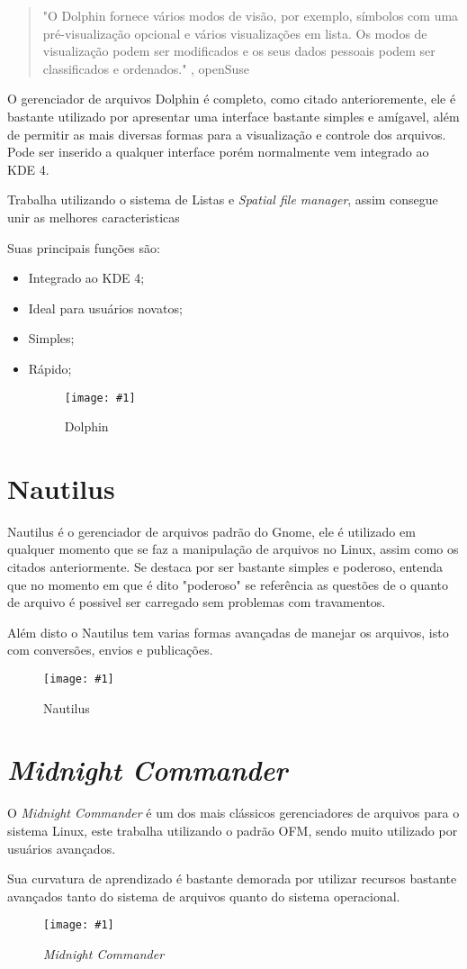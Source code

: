 \documentclass[
	12pt,				%
	openright,			%
	twoside,			%
	a4paper,			%
	chapter=TITLE,		%
	section=TITLE,		%
	english,	
	brazil				%
]{abntex2}
\newcommand{\imagem}[3]{
	\begin{figure}[htb]
		\begin{center}
			\texttt{[image: \#1]}
		\end{center}
		\caption{#2}%
	\end{figure}	
}
\begin{document}
\begin{quote}
"O Dolphin fornece vários modos de visão, por exemplo, símbolos com uma pré-visualização opcional e vários visualizações em lista. Os modos de visualização podem ser modificados e os seus dados pessoais podem ser classificados e ordenados." , openSuse
\end{quote}

O gerenciador de arquivos Dolphin é completo, como citado anterioremente, ele é bastante utilizado por apresentar uma interface bastante simples e amígavel, além de permitir as mais diversas formas para a visualização e controle dos arquivos. Pode ser inserido a qualquer interface porém normalmente vem integrado ao KDE 4.

Trabalha utilizando o sistema de Listas e \textit{Spatial file manager}, assim consegue unir as melhores caracteristicas 

Suas principais funções são:

\begin{itemize}
	\item Integrado ao KDE 4;
	\item Ideal para usuários novatos;
	\item Simples;
	\item Rápido;
	\imagem{dolphinGec.jpg}{Dolphin}{rótulo_para_referência}
\end{itemize}

\section{Nautilus}

Nautilus é o gerenciador de arquivos padrão do Gnome, ele é utilizado em qualquer momento que se faz a manipulação de arquivos no Linux, assim como os citados anteriormente. Se destaca por ser bastante simples e poderoso, entenda que no momento em que é dito "poderoso" se referência as questões de o quanto de arquivo é possivel ser carregado sem problemas com travamentos.

Além disto o Nautilus tem varias formas avançadas de manejar os arquivos, isto com conversões, envios e publicações.

\imagem{Nautilus.png}{Nautilus}{rótulo_para_referência}


\section{\textit{Midnight Commander}}

O \textit{Midnight Commander} é um dos mais clássicos gerenciadores de arquivos para o sistema Linux, este trabalha utilizando o padrão OFM, sendo muito utilizado por usuários avançados.

Sua curvatura de aprendizado é bastante demorada por utilizar recursos bastante avançados tanto do sistema de arquivos quanto do sistema operacional.

\imagem{mc.png}{\textit{Midnight Commander}}{rótulo_para_referência}
\end{document}

